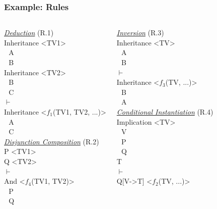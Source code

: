 \documentclass{beamer}
\begin{document}
\frame
{
  \frametitle{Example: Rules}
  
  {\tiny
  \begin{columns}
    
    \column{1.5in}
    
    \underline{\alert{{\it Deduction}}} (R.1)\\[.2cm]
    Inheritance <TV1>\\
    $\ \ \ $A\\
    $\ \ \ $B\\
    Inheritance <TV2>\\
    $\ \ \ $B\\
    $\ \ \ $C\\
    $\vdash$\\
    Inheritance <$f_1$(TV1, TV2, ...)>\\
    $\ \ \ $A\\
    $\ \ \ $C\\[.5cm]

    \underline{\alert{{\it Disjunction Composition}}} (R.2)\\[.2cm]
    P <TV1>\\
    Q <TV2>\\
    $\vdash$\\
    And <$f_4$(TV1, TV2)>\\
    $\ \ \ $P\\
    $\ \ \ $Q\\

    \column{1.5in}

    \underline{\alert{{\it Inversion}}} (R.3)\\[.2cm]
    Inheritance <TV>\\
    $\ \ \ $A\\
    $\ \ \ $B\\
    $\vdash$\\
    Inheritance <$f_3$(TV, ...)>\\
    $\ \ \ $B\\
    $\ \ \ $A\\[.5cm]

    \underline{\alert{{\it Conditional Instantiation}}} (R.4)\\[.2cm]
    Implication <TV>\\
    $\ \ \ $V\\
    $\ \ \ $P\\
    $\ \ \ $Q\\
    T\\
    $\vdash$\\
    Q[V->T] <$f_2$(TV, ...)>\\

  \end{columns}

  }
}
\end{document}
